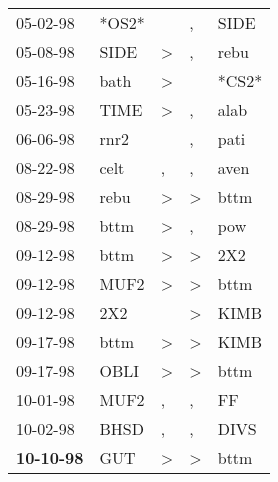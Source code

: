 \begin{supertabular}{p{0.07\textwidth}p{0.06\textwidth}p{0.02\textwidth}p{0.02\textwidth}p{0.06\textwidth}}
          05-02-98\textsuperscript{} &                   *OS2* &               &             , &  SIDE\textsuperscript{} \\
          05-08-98\textsuperscript{} &  SIDE\textsuperscript{} &  \textgreater &             , &  rebu\textsuperscript{} \\
          05-16-98\textsuperscript{} &  bath\textsuperscript{} &  \textgreater &               &                   *CS2* \\
          05-23-98\textsuperscript{} &  TIME\textsuperscript{} &  \textgreater &             , &  alab\textsuperscript{} \\
          06-06-98\textsuperscript{} &  rnr2\textsuperscript{} &               &             , &  pati\textsuperscript{} \\
          08-22-98\textsuperscript{} &  celt\textsuperscript{} &             , &             , &  aven\textsuperscript{} \\
          08-29-98\textsuperscript{} &  rebu\textsuperscript{} &  \textgreater &  \textgreater &  bttm\textsuperscript{} \\
          08-29-98\textsuperscript{} &  bttm\textsuperscript{} &  \textgreater &             , &   pow\textsuperscript{} \\
          09-12-98\textsuperscript{} &  bttm\textsuperscript{} &  \textgreater &  \textgreater &   2X2\textsuperscript{} \\
          09-12-98\textsuperscript{} &  MUF2\textsuperscript{} &  \textgreater &  \textgreater &  bttm\textsuperscript{} \\
          09-12-98\textsuperscript{} &   2X2\textsuperscript{} &               &  \textgreater &  KIMB\textsuperscript{} \\
          09-17-98\textsuperscript{} &  bttm\textsuperscript{} &  \textgreater &  \textgreater &  KIMB\textsuperscript{} \\
          09-17-98\textsuperscript{} &  OBLI\textsuperscript{} &  \textgreater &  \textgreater &  bttm\textsuperscript{} \\
          10-01-98\textsuperscript{} &  MUF2\textsuperscript{} &             , &             , &    FF\textsuperscript{} \\
          10-02-98\textsuperscript{} &  BHSD\textsuperscript{} &             , &             , &  DIVS\textsuperscript{} \\
 \textbf{10-10-98\textsuperscript{}} &   GUT\textsuperscript{} &  \textgreater &  \textgreater &  bttm\textsuperscript{} \\

\end{supertabular}
